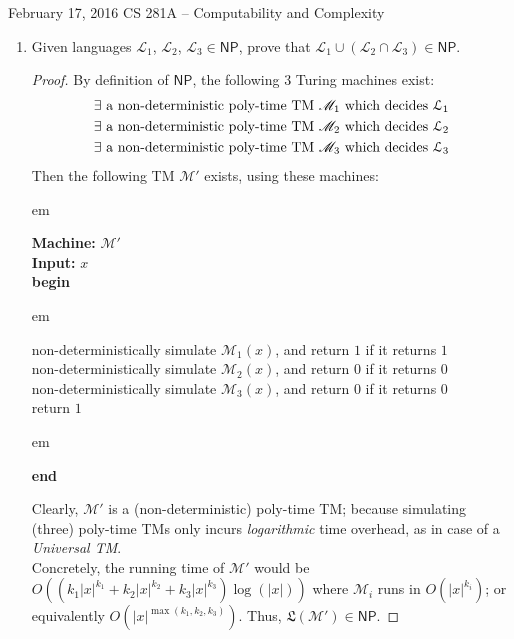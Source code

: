 \documentclass[usletter]{article}
\newcommand {\langset}[1]      {\ensuremath{\mathcal{#1}}}
\newcommand {\machine}[1]      {\ensuremath{\mathscr{#1}}}
\newcommand {\langfunc}        {\ensuremath{\mathfrak{L}}}
\newcommand {\family}[1]       {\ensuremath{\mathsf{#1}}}
\newcommand {\term}[1]      {\textit{#1}}
\newcommand {\indpar}[1]   {
  \par\leftskip=#1em
  \noindent\ignorespaces
}
\newenvironment{turing}[2] {
  \smallskip
  \indpar{2}
  \textbf{Machine:} #1\\
  \textbf{Input:} $#2$\\[5pt]
  \textbf{begin}
  \parskip=0pt
  \indpar{3}
}{
  \indpar{2}
  \textbf{end}
  \par\medskip
}
\newcommand {\langL}          {\langset{L}}
\newcommand {\machineM}       {\machine{M}}
\begin{document}
 {February 17, 2016}
            {CS 281A -- Computability and Complexity}

\begin{enumerate}
  \item Given languages $\langL_1$, $\langL_2$, $\langL_3 \in \family{NP}$,
        prove that $\langL_1 \cup (\langL_2 \cap \langL_3) \in \family{NP}$.
  \begin{proof}
    By definition of \family{NP}, the following $3$ Turing machines exist:
    \begin{align}
      \label{q1_m1} \exists \textnormal{ a non-deterministic poly-time TM }
                      \machineM_1 \textnormal{ which decides } \langL_1 \\
      \label{q1_m2} \exists \textnormal{ a non-deterministic poly-time TM }
                      \machineM_2 \textnormal{ which decides } \langL_2 \\
      \label{q1_m3} \exists \textnormal{ a non-deterministic poly-time TM }
                      \machineM_3 \textnormal{ which decides } \langL_3
    \end{align}
    Then the following TM $\machineM'$ exists, using these machines:
    \begin{turing}{$\machineM'$}{x}
      non-deterministically simulate $\machineM_1(x)$,
        and return $1$ if it returns $1$ \\
      non-deterministically simulate $\machineM_2(x)$,
        and return $0$ if it returns $0$ \\
      non-deterministically simulate $\machineM_3(x)$,
        and return $0$ if it returns $0$ \\
      return $1$
    \end{turing}
    Clearly, $\machineM'$ is a (non-deterministic) poly-time TM;
    because simulating (three) poly-time TMs only incurs \textit{logarithmic}
    time overhead, as in case of a \term{Universal TM}. \\
    Concretely, the running time of $\machineM'$ would be
    $O((k_1 |x|^{k_1} + k_2 |x|^{k_2} + k_3 |x|^{k_3}) \log(|x|))$
    where $\machineM_i$ runs in $O(|x|^{k_i})$;
    or equivalently $O(|x|^{\max(k_1, k_2, k_3)})$.
    Thus, $\langfunc(\machineM') \in \family{NP}$.


\end{proof}
\end{enumerate}
\end{document}
